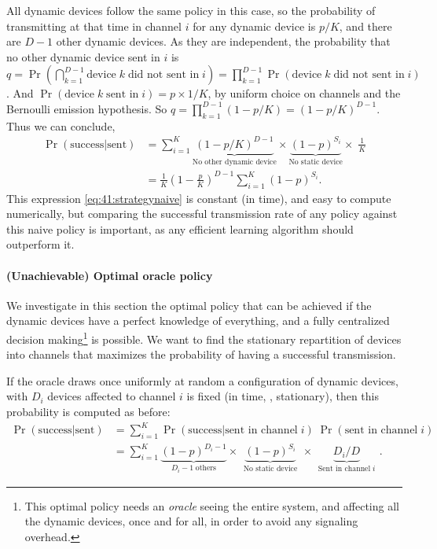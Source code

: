 All dynamic devices follow the same policy in this case, so the probability of transmitting at that time in channel $i$ for any dynamic device is $p / K$, and there are $D-1$ other dynamic devices.
As they are independent, the probability that no other dynamic device sent in $i$
is $q = \Pr(\bigcap_{k=1}^{D-1} \text{device}\;k\;\text{did not sent in}\;i) = \prod_{k=1}^{D-1} \Pr(\text{device}\;k\;\text{did not sent in}\;i)$. And $\Pr(\text{device}\;k\;\text{sent in}\;i) = p \times 1 / K$, by uniform choice on channels and the Bernoulli emission hypothesis. So $q = \prod_{k=1}^{D-1} (1 - p/K) = (1-p/K)^{D-1}$. Thus we can conclude,
%
\begin{align}\label{eq:41:strategynaive}
    \Pr(\text{success}|\text{sent})
    & = \sum_{i=1}^{K} \underbrace{(1 - p / K)^{D-1}}_{\text{No other dynamic device}} \times \underbrace{(1-p)^{S_i}}_{\text{No static device}} \times\; \frac{1}{K} \nonumber \\
    & = \frac{1}{K} \left(1-\frac{p}{K}\right)^{D-1} \sum_{i=1}^{K} (1-p)^{S_i} .
\end{align}
This expression \eqref{eq:41:strategynaive} is constant (in time), and easy to compute numerically, but comparing the successful transmission rate of any policy against this naive policy is important, as any efficient learning algorithm should outperform it.


\paragraph{(Unachievable) Optimal oracle policy}

We investigate in this section the optimal policy that can be achieved if the dynamic devices have a perfect knowledge of everything, and a fully centralized decision making\footnote{This optimal policy needs an \emph{oracle} seeing the entire system, and affecting all the dynamic devices, once and for all, in order to avoid any signaling overhead.} is possible.
We want to find the stationary repartition of devices into channels that maximizes the probability of having a successful transmission.

If the oracle draws once uniformly at random a configuration of dynamic devices, with $D_i$ devices affected to channel $i$ is fixed (in time, \ie, stationary),
then this probability is computed as before:
\begin{align}\label{eq:41:prob_col}
    \Pr(\text{success}|\text{sent})
    & = \sum_{i=1}^{K} \Pr(\text{success}|\text{sent in channel}\;i) \; \Pr(\text{sent in channel}\;i) \nonumber \\
    & = \sum_{i=1}^{K} \underbrace{(1 - p)^{D_i - 1}}_{\;\;D_i - 1 \;\text{others}\;\;} \times \underbrace{(1 - p)^{S_i}}_{\;\;\text{No static device}\;\;} \times \underbrace{ D_i / D }_{\;\;\text{Sent in channel}\; i\;\;}.
\end{align}

